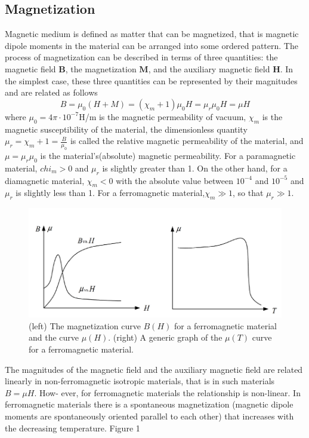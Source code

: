 \documentclass[12pt]{article}
\begin{document}
\subsection{Magnetization}
Magnetic medium is defined as matter that can be magnetized, that is magnetic dipole
moments in the material can be arranged into some ordered pattern. The process of
magnetization can be described in terms of three quantities: the magnetic field $\mathbf{B}$, the magnetization $\mathbf{M}$, and the auxiliary magnetic field $\mathbf{H}$. In the simplest case, these three quantities can be represented by their magnitudes and are related as follows
$$B=\mu_0(H+M)=(\chi_m+1)\mu_0H=\mu_r\mu_0H=\mu H$$
where $\mu_0=4\pi\cdot 10^{-7}$H/m is the magnetic permeability of vacuum, $\chi_m$ is the magnetic susceptibility of the material, the dimensionless quantity $\mu_r=\chi_m+1=\frac{B}{\mu_0}$ is called the relative magnetic permeability of the material, and $\mu=\mu_r\mu_0$ is the material's(absolute) magnetic permeability. For a paramagnetic material, $chi_m>0$ and $\mu_r$ is slightly greater than 1. On the other hand, for a diamagnetic material, $\chi_m<0$ with the absolute value between $10^{-4}$ and $10^{-5}$ and $\mu_r$ is slightly less than 1. For a ferromagnetic material,$\chi_m\gg1$, so that $\mu_r\gg1$.
\begin{figure}[H]
\centering
\includegraphics[scale=0.5]{P1.jpg}
\caption{(left) The magnetization curve $B(H)$ for a ferromagnetic material and the
curve $\mu(H)$. (right) A generic graph of the $\mu(T)$ curve for a ferromagnetic material.}
\end{figure}
The magnitudes of the magnetic field and the auxiliary magnetic field are related
linearly in non-ferromagnetic isotropic materials, that is in such materials $B = \mu H$. How-
ever, for ferromagnetic materials the relationship is non-linear. In ferromagnetic materials
there is a spontaneous magnetization (magnetic dipole moments are spontaneously oriented parallel to each other) that increases with the decreasing temperature. Figure 1
\end{document}

